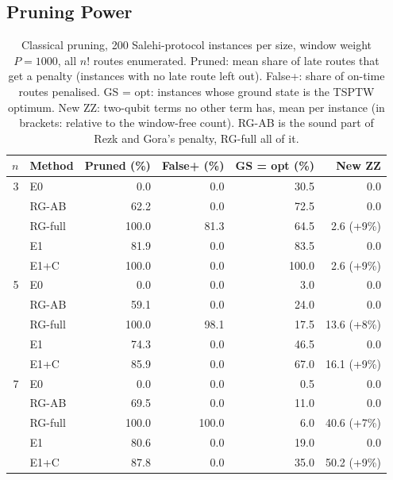 \subsection{Pruning Power}\label{sec:res-pruning}
\begin{table}[t]
\caption{Classical pruning, 200 Salehi-protocol instances per size, window weight $P = 1000$,
all $n!$ routes enumerated. Pruned: mean share of late routes that get a penalty (instances
with no late route left out). False+: share of on-time routes penalised. GS = opt: instances
whose ground state is the TSPTW optimum. New ZZ: two-qubit terms no other term has, mean per
instance (in brackets: relative to the window-free count). RG-AB is the sound part of Rezk and
Gora's penalty, RG-full all of it.}\label{tab:pruning}
\centering\small\setlength{\tabcolsep}{5pt}
\begin{tabular}{rlrrrr}
\toprule
$n$ & Method & Pruned (\%) & False+ (\%) & GS = opt (\%) & New ZZ\\
\midrule
3 & E0      &   0.0 &   0.0 &  30.5 & 0.0\\
  & RG-AB   &  62.2 &   0.0 &  72.5 & 0.0\\
  & RG-full & 100.0 &  81.3 &  64.5 & 2.6 (+9\%)\\
  & E1      &  81.9 &   0.0 &  83.5 & 0.0\\
  & E1+C    & 100.0 &   0.0 & 100.0 & 2.6 (+9\%)\\
\midrule
5 & E0      &   0.0 &   0.0 &   3.0 & 0.0\\
  & RG-AB   &  59.1 &   0.0 &  24.0 & 0.0\\
  & RG-full & 100.0 &  98.1 &  17.5 & 13.6 (+8\%)\\
  & E1      &  74.3 &   0.0 &  46.5 & 0.0\\
  & E1+C    &  85.9 &   0.0 &  67.0 & 16.1 (+9\%)\\
\midrule
7 & E0      &   0.0 &   0.0 &   0.5 & 0.0\\
  & RG-AB   &  69.5 &   0.0 &  11.0 & 0.0\\
  & RG-full & 100.0 & 100.0 &   6.0 & 40.6 (+7\%)\\
  & E1      &  80.6 &   0.0 &  19.0 & 0.0\\
  & E1+C    &  87.8 &   0.0 &  35.0 & 50.2 (+9\%)\\
\bottomrule
\end{tabular}
\end{table}
